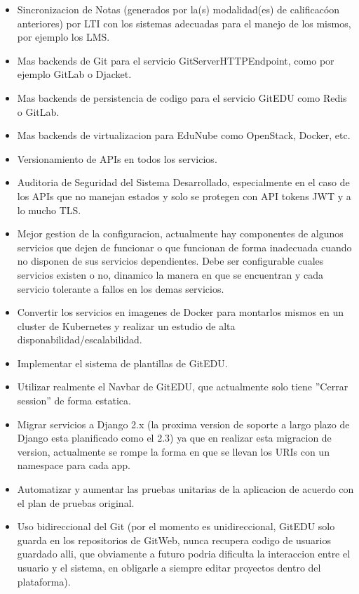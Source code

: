\begin{itemize}
\begin{itemize}
    \end{itemize}
    \item Sincronizacion de Notas (generados por la(s) modalidad(es) de calificacóon anteriores) por LTI con los sistemas adecuadas para el manejo de los mismos, por ejemplo los LMS.
    \item Mas backends de Git para el servicio GitServerHTTPEndpoint, como por ejemplo GitLab o Djacket.
    \item Mas backends de persistencia de codigo para el servicio GitEDU como Redis o GitLab.
    \item Mas backends de virtualizacion para EduNube como OpenStack, Docker, etc.
    \item Versionamiento de APIs en todos los servicios.
    \item Auditoria de Seguridad del Sistema Desarrollado, especialmente en el caso de los APIs que no manejan estados y solo se protegen con API tokens JWT y a lo mucho TLS.
    \item Mejor gestion de la configuracion, actualmente hay componentes de algunos servicios que dejen de funcionar o que funcionan de forma inadecuada cuando no disponen de sus servicios dependientes. Debe ser configurable cuales servicios existen o no, dinamico la manera en que se encuentran y cada servicio tolerante a fallos en los demas servicios.
    \item Convertir los servicios en imagenes de Docker para montarlos mismos en un cluster de Kubernetes y realizar un estudio de alta disponabilidad/escalabilidad.
    \item Implementar el sistema de plantillas de GitEDU.
    \item Utilizar realmente el Navbar de GitEDU, que actualmente solo tiene ''Cerrar session'' de forma estatica.
    \item Migrar servicios a Django 2.x (la proxima version de soporte a largo plazo de Django esta planificado como el 2.3) ya que en realizar esta migracion de version, actualmente se rompe la forma en que se llevan los URIs con un namespace para cada app.
    \item Automatizar y aumentar las pruebas unitarias de la aplicacion de acuerdo con el plan de pruebas original.
    \item Uso bidireccional del Git (por el momento es unidireccional, GitEDU solo guarda en los repositorios de GitWeb, nunca recupera codigo de usuarios guardado alli, que obviamente a futuro podria dificulta la interaccion entre el usuario y el sistema, en obligarle a siempre editar proyectos dentro del plataforma).

\end{itemize}
